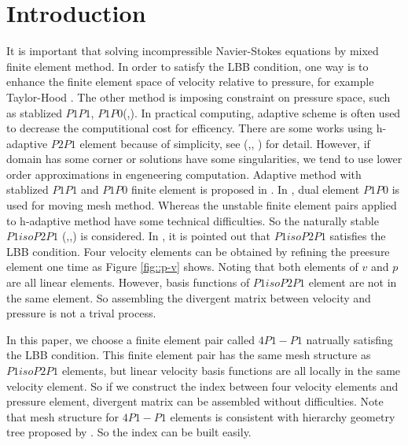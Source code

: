 \documentclass[a4paper, 11pt]{article}
\begin{document}
\section{Introduction}

    It is important that solving incompressible
    Navier-Stokes equations by mixed finite element method. In order to
    satisfy the LBB condition, one way is to enhance the finite
    element space of velocity relative to pressure, for example 
    Taylor-Hood \cite{taylor1974navier}. The other method is imposing
    constraint on pressure space, such as stablized $P1P1$,
    $P1P0$(\cite{li2009performance},\cite{bochev2006stabilization}). 
    In practical computing, adaptive scheme is often used to decrease the
    computitional cost for efficency. There are some works
    using h-adaptive $P2P1$ element because of simplicity, see
    (\cite{danaila2014newton},\cite{ebeida2009unsteady},
    \cite{berrone2009space}) for detail. However, if domain has some
    corner or solutions have some singularities, we tend to use lower
    order approximations in engeneering computation. Adaptive method with
    stablized $P1P1$ and $P1P0$ finite element is proposed in
    \cite{zheng2010posteriori}. In \cite{di2005moving},
    dual element $P1P0$ is used for moving mesh method. Whereas the
    unstable finite element pairs applied to h-adaptive method have some
    technical difficulties. So the naturally stable $P1isoP2P1$
    (\cite{vanden2009kinetic},\cite{fujima1998iso},\cite{bercovier1979error})
    is considered. In \cite{bercovier1979error}, it is pointed out that
    $P1isoP2P1$  satisfies the LBB condition. Four velocity
    elements can be obtained by refining the preesure element one
    time as Figure \ref{fig::p-v} shows. Noting that both elements of
    $v$ and $p$ are all linear elements. However, basis functions of
    $P1isoP2P1$ element are not in the same element. So
    assembling the divergent matrix between velocity and pressure is
    not a trival process. 
    
    In this paper, we choose a finite element pair called $4P1-P1$
    natrually satisfing the LBB condition. This finite element
    pair has the same mesh structure as $P1isoP2P1$ elements, but
    linear velocity basis functions are all locally in the same velocity
    element. So if we construct the index between four velocity
    elements and pressure element, divergent matrix can be assembled
    without difficulties. Note that mesh structure for $4P1-P1$ elements is
    consistent with hierarchy geometry tree proposed by
    \cite{li2005multi}. So the index can be built easily.
\end{document}
